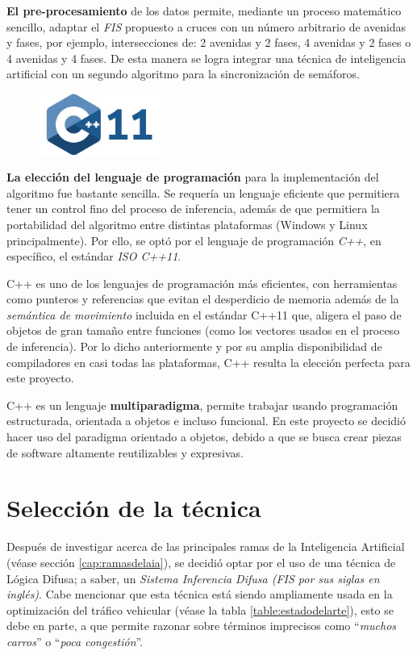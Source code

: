 \textbf{El pre-procesamiento} de los datos permite, mediante un proceso matemático sencillo, adaptar el \emph{FIS} propuesto a cruces con un número arbitrario de avenidas y fases, por ejemplo, intersecciones de: 2 avenidas y 2 fases, 4 avenidas y 2 fases o 4 avenidas y 4 fases. De esta manera se logra integrar una técnica de inteligencia artificial con un segundo algoritmo para la sincronización de semáforos.

\begin{figure}
	\includegraphics[width=4cm]{Sources/logo_cpp11.jpg}
\end{figure}

\textbf{La elección del lenguaje de programación} para la implementación del algoritmo fue bastante sencilla. Se requería un lenguaje eficiente que permitiera tener un control fino del proceso de inferencia, además de que permitiera la portabilidad del algoritmo entre distintas plataformas (Windows y Linux principalmente). Por ello, se optó por el lenguaje de programación \emph{C++}, en específico, el estándar \emph{ISO C++11}.

C++ es uno de los lenguajes de programación más eficientes, con herramientas como punteros y referencias que evitan el desperdicio de memoria además de la \emph{semántica de movimiento} incluida en el estándar \textsc{C++11} que, aligera el paso de objetos de gran tamaño entre funciones (como los vectores usados en el proceso de inferencia). Por lo dicho anteriormente y por su amplia disponibilidad de compiladores en casi todas las plataformas, C++ resulta la elección perfecta para este proyecto.

C++ es un lenguaje \textbf{multiparadigma}, permite trabajar usando programación estructurada, orientada a objetos e incluso funcional. En este proyecto se decidió hacer uso del paradigma orientado a objetos, debido a que se busca crear piezas de software altamente reutilizables y expresivas.

\section{Selección de la técnica}\label{section:selecciontecnica}
Después de investigar acerca de las principales ramas de la Inteligencia Artificial (véase sección \ref{cap:ramasdelaia}), se decidió optar por el uso de una técnica de Lógica Difusa; a saber, un \emph{Sistema Inferencia Difusa (FIS por sus siglas en inglés)}. Cabe mencionar que esta técnica está siendo ampliamente usada en la optimización del tráfico vehicular (véase la tabla \ref{table:estadodelarte}), esto se debe en parte, a que permite razonar sobre términos imprecisos como ``\emph{muchos carros}'' o ``\emph{poca congestión}''.\\

